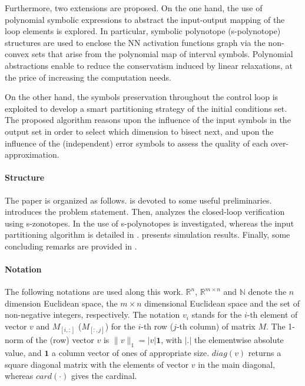 \documentclass[journal]{IEEEtran}
\begin{document}
Furthermore, two extensions are proposed. On the one hand, the use of polynomial symbolic expressions to abstract the input-output mapping of the loop elements is explored. In particular, symbolic polynotope (s-polynotope) structures \cite{combastel2020functional} are used to enclose the NN activation functions graph via the non-convex sets that arise from the polynomial map of interval symbols. Polynomial abstractions enable to reduce the conservatism induced by linear relaxations, at the price of increasing the computation needs.

On the other hand, the  symbols preservation throughout the control loop is exploited to develop a  smart partitioning strategy of the initial conditions set. The proposed algorithm reasons upon the influence of the input symbols in the output set in order to select which dimension to bisect next, and upon the influence of the (independent) error symbols to assess the quality of each over-approximation. 


\paragraph*{Structure} The paper is organized as follows.  is devoted to some useful preliminaries.  introduces the problem statement. Then,   analyzes the closed-loop verification using s-zonotopes. In   the use of s-polynotopes is investigated, whereas the input partitioning algorithm is detailed in .  presents simulation results. Finally,  some concluding remarks are provided in . 


\paragraph*{Notation} The following notations are used along this work. $\mathbb{R}^n$, $\mathbb{R}^{m\times n}$ and $\mathbb{N}$ denote the $n$ dimension Euclidean space, the $m \times n$ dimensional Euclidean space and the set of non-negative integers, respectively. The notation $v_i$ stands for the $i$-th element of vector $v$ and $M_{[i,:]}$ ($M_{[:,j]}$) for the $i$-th row ($j$-th column) of matrix $M$. The 1-norm  of the (row) vector $v$ is $\|v\|_1 = |v|\mathbf{1}$, with $|.|$  the elementwise absolute value, and $\mathbf{1}$ a column vector of ones of appropriate size. $diag(v)$ returns a square diagonal matrix with the elements of vector $v$ in the main diagonal, whereas $card(\cdot)$ gives the cardinal.
\end{document}
